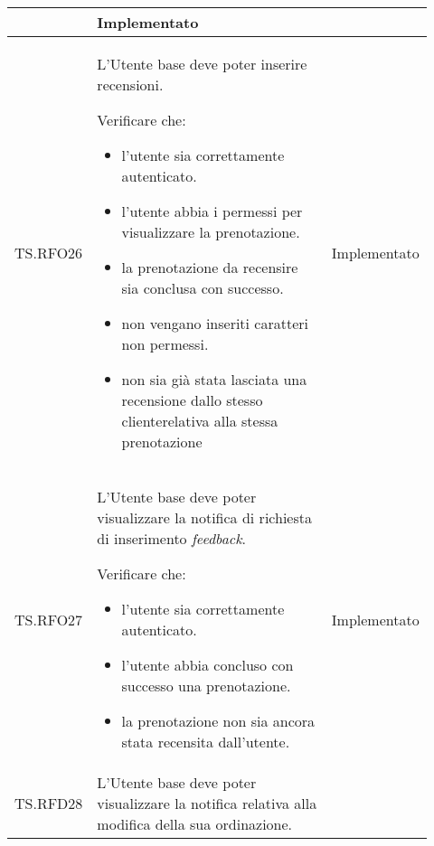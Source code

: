 \begin{longtable}{|p{0.10\linewidth}|p{0.70\linewidth}|p{0.12\linewidth}|}
\begin{itemize}
	\end{itemize}                                                     &
	Implementato                                                                                                                                                   \\
	\hline
	TS.RFO26                                                                                                                        &
	L'Utente base deve poter inserire recensioni.   \par
	Verificare che:
	\begin{itemize}
		\item l'utente sia correttamente autenticato.
		\item l'utente abbia i permessi per visualizzare la prenotazione.
		\item la prenotazione da recensire sia conclusa con successo.
		\item non vengano inseriti caratteri non permessi.
		\item non sia già stata lasciata una recensione dallo stesso cliente\g relativa alla stessa prenotazione
	\end{itemize}                        &
	Implementato                                                                                                                                                   \\
	\hline
	TS.RFO27                                                                                                                        &
	L'Utente base deve poter visualizzare la notifica di richiesta di inserimento \textit{feedback}.\par
	Verificare che:
	\begin{itemize}
		\item l'utente sia correttamente autenticato.
		\item l'utente abbia concluso con successo una prenotazione.
		\item la prenotazione non sia ancora stata recensita dall'utente.
	\end{itemize}                                                               &
	Implementato                                                                                                                                                   \\
	\hline
	TS.RFD28                                                                                                                        &
	L'Utente base deve poter visualizzare la notifica relativa alla modifica della sua ordinazione.\par

\end{longtable}
